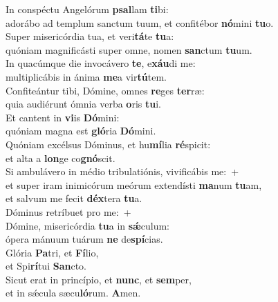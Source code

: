 \evenverse In conspéctu Angelórum \textbf{psal}lam \textbf{ti}bi:~\*\\
\evenverse adorábo ad templum sanctum tuum, et confitébor \textbf{nó}mini \textbf{tu}o.\\
\oddverse Super misericórdia tua, et veri\textbf{tá}te \textbf{tu}a:~\*\\
\oddverse quóniam magnificásti super omne, nomen \textbf{san}ctum \textbf{tu}um.\\
\evenverse In quacúmque die invocávero \textbf{te}, e\textbf{xáu}di me:~\*\\
\evenverse multiplicábis in ánima \textbf{me}a vir\textbf{tú}tem.\\
\oddverse Confiteántur tibi, Dómine, omnes \textbf{re}ges \textbf{ter}ræ:~\*\\
\oddverse quia audiérunt ómnia verba \textbf{o}ris \textbf{tu}i.\\
\evenverse Et cantent in \textbf{vi}is \textbf{Dó}mini:~\*\\
\evenverse quóniam magna est \textbf{gló}ria \textbf{Dó}mini.\\
\oddverse Quóniam excélsus Dóminus, et hu\textbf{mí}lia \textbf{ré}spicit:~\*\\
\oddverse et alta a \textbf{lon}ge co\textbf{gnó}scit.\\
\evenverse Si ambulávero in médio tribulatiónis, vivificábis me:~+\\
\evenverse  et super iram inimicórum meórum extendísti \textbf{ma}num \textbf{tu}am,~\*\\
\evenverse et salvum me fecit \textbf{déx}tera \textbf{tu}a.\\
\oddverse Dóminus retríbuet pro me:~+\\
\oddverse  Dómine, misericórdia \textbf{tu}a in \textbf{sǽ}culum:~\*\\
\oddverse ópera mánuum tuárum \textbf{ne} de\textbf{spí}cias.\\
\evenverse Glória \textbf{Pa}tri, et \textbf{Fí}lio,~\*\\
\evenverse et Spi\textbf{rí}tui \textbf{San}cto.\\
\oddverse Sicut erat in princípio, et \textbf{nunc}, et \textbf{sem}per,~\*\\
\oddverse et in sǽcula sæcu\textbf{ló}rum. \textbf{A}men.\\
